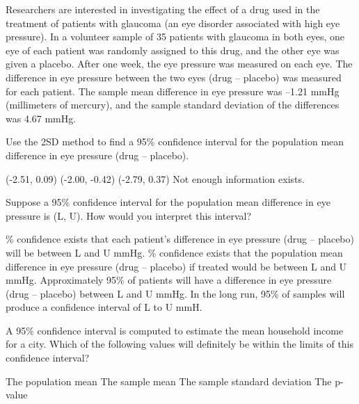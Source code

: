 \documentclass{article}
\begin{document}
	Researchers are interested in investigating the effect of a drug used in the treatment of patients with glaucoma (an eye disorder associated with high eye pressure). In a volunteer sample of 35 patients with glaucoma in both eyes, one eye of each patient was randomly assigned to this drug, and the other eye was given a placebo. After one week, the eye pressure was measured on each eye. The difference in eye pressure between the two eyes (drug – placebo) was measured for each patient. The sample mean difference in eye pressure was –1.21 mmHg (millimeters of mercury), and the sample standard deviation of the differences was 4.67 mmHg.
	\begin{mcquestions}
		\question Use the 2SD method to find a 95\% confidence interval for the population mean difference in eye pressure (drug – placebo).
		\begin{mcanswerslist}
			\answer  (-2.51, 0.09)
			\answer  (-2.00, -0.42)
			\answer[correct]  (-2.79, 0.37)
			\answer  Not enough information exists.
		\end{mcanswerslist}
		
		\question Suppose a 95\% confidence interval for the population mean difference in eye pressure is (L, U). How would you interpret this interval?
		\begin{mcanswerslist}
			\% confidence exists that each patient's difference in eye pressure (drug – placebo) will be between L and U mmHg.
			\% confidence exists that the population mean difference in eye pressure (drug – placebo) if treated would be between L and U mmHg.
			\answer  Approximately 95\% of patients will have a difference in eye pressure (drug – placebo) between L and U mmHg.
			\answer  In the long run, 95\% of samples will produce a confidence interval of L to U mmH.
		\end{mcanswerslist}
		
		\question A 95\% confidence interval is computed to estimate the mean household income for a city. Which of the following values will definitely be within the limits of this confidence interval?
		\begin{mcanswerslist}
			\answer  The population mean
			\answer[correct]  The sample mean
			\answer  The sample standard deviation
			\answer  The p-value
		\end{mcanswerslist}
		

\end{mcquestions}
\end{document}

